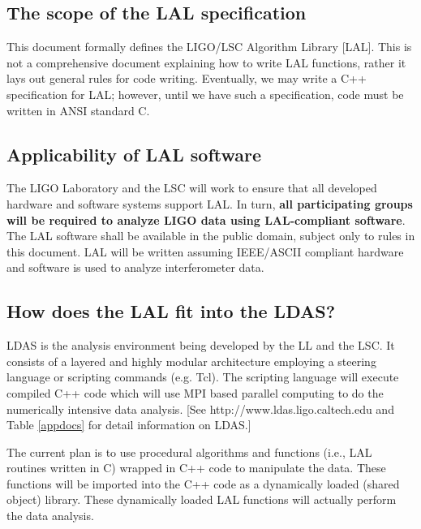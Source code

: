 \documentclass[]{ligodcc}
\begin{document}
\subsection{The scope of the LAL specification}

This document formally defines the LIGO/LSC Algorithm Library [LAL].
This is not a comprehensive document explaining how to write LAL
functions, rather it lays out general rules for code writing.
Eventually, we may write a C++ specification for LAL; however, until
we have such a specification, code must be written in  ANSI standard
C.

\subsection{Applicability of LAL software}

The LIGO Laboratory and the LSC will work to ensure that all developed
hardware and software systems support LAL. In turn,  {\bf all participating
groups will be required to analyze LIGO data using LAL-compliant
software}. The LAL software shall be available in the public domain,
subject only to rules in this document. LAL will be written assuming
IEEE/ASCII compliant hardware and software is used to analyze
interferometer data.

\subsection{How does the LAL fit into the  LDAS?}

LDAS is the analysis environment being developed by the LL and the LSC.
It consists of a layered and highly modular architecture employing a
steering language or scripting commands (e.g. Tcl).  The scripting
language  will execute compiled   C++ code which will use MPI  based
parallel computing to do the numerically intensive data analysis. [See
http://www.ldas.ligo.caltech.edu  and Table \ref{appdocs} for detail information
on LDAS.]

The current plan is to use procedural algorithms and  functions (i.e.,
LAL routines written in C) wrapped in  C++ code to manipulate the
data. These functions will be imported into the C++ code as a
dynamically loaded (shared object) library. These dynamically loaded
LAL functions will actually perform the data analysis.
\end{document}
